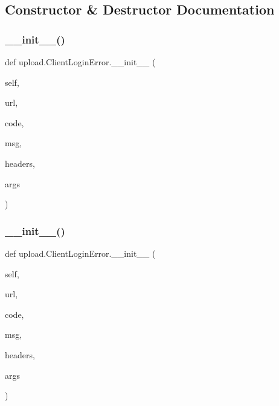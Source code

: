 \subsection{Constructor \& Destructor Documentation}
\mbox{\label{classupload_1_1ClientLoginError_a1e590616c2976d881e155958cedbbe47}} 
\subsubsection{\texorpdfstring{\_\_init\_\_()}{\_\_init\_\_()}\hspace{0.1cm}{\footnotesize\ttfamily [1/2]}}
{\footnotesize\ttfamily def upload.\+Client\+Login\+Error.\+\_\+\+\_\+init\+\_\+\+\_\+ (\begin{DoxyParamCaption}\item[{}]{self,  }\item[{}]{url,  }\item[{}]{code,  }\item[{}]{msg,  }\item[{}]{headers,  }\item[{}]{args }\end{DoxyParamCaption})}

\mbox{\label{classupload_1_1ClientLoginError_a1e590616c2976d881e155958cedbbe47}} 
\subsubsection{\texorpdfstring{\_\_init\_\_()}{\_\_init\_\_()}\hspace{0.1cm}{\footnotesize\ttfamily [2/2]}}
{\footnotesize\ttfamily def upload.\+Client\+Login\+Error.\+\_\+\+\_\+init\+\_\+\+\_\+ (\begin{DoxyParamCaption}\item[{}]{self,  }\item[{}]{url,  }\item[{}]{code,  }\item[{}]{msg,  }\item[{}]{headers,  }\item[{}]{args }\end{DoxyParamCaption})}



